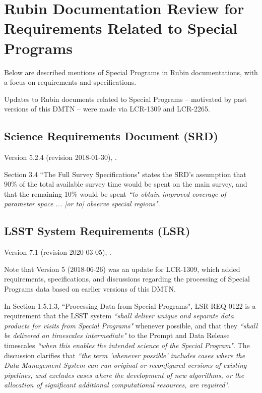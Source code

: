 \section{Rubin Documentation Review for Requirements Related to Special Programs}\label{sec:docrev}

Below are described mentions of Special Programs in Rubin documentations, with a focus on requirements and specifications.

Updates to Rubin documents related to Special Programs -- motivated by past versions of this DMTN -- were made via LCR-1309 and LCR-2265. 



\subsection{Science Requirements Document (SRD)}

Version 5.2.4 (revision 2018-01-30), .

Section 3.4 ``The Full Survey Specifications" states the SRD's assumption that 90\% of the total available survey time would be spent on the main survey, and that the remaining 10\% would be spent {\it ``to obtain improved coverage of parameter space ... [or to] observe special regions"}.



\subsection{LSST System Requirements (LSR)}

Version 7.1 (revision 2020-03-05), .

Note that Version 5 (2018-06-26) was an update for LCR-1309, which added requirements, specifications, and discussions regarding the processing of Special Programs data based on earlier versions of this DMTN.

In Section 1.5.1.3, ``Processing Data from Special Programs", LSR-REQ-0122 is a requirement that the LSST system {\it ``shall deliver unique and separate data products for visits from Special Programs"} whenever possible, and that they {\it ``shall be delivered on timescales intermediate"} to the Prompt and Data Release timescales {\it ``when this enables the intended science of the Special Program"}.
The discussion clarifies that {\it ``the term 'whenever possible' includes cases where the Data Management System can run original or reconfigured versions of existing pipelines, and excludes cases where the development of new algorithms, or the allocation of significant additional computational resources, are required"}.


